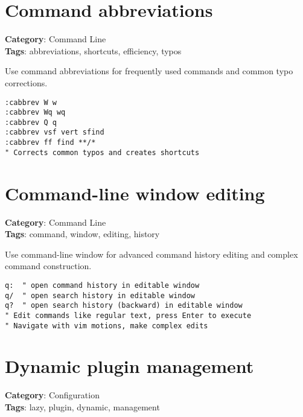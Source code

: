 {{{\section{Command abbreviations}

\textbf{Category}: Command Line\\ \textbf{Tags}: abbreviations, shortcuts, efficiency, typos
\vspace{0.5cm}

Use command abbreviations for frequently used commands and common typo corrections.

\begin{Exa*}{}
\begin{Verbatim}[fontsize=\footnotesize, breaklines, breakanywhere]
:cabbrev W w
:cabbrev Wq wq
:cabbrev Q q
:cabbrev vsf vert sfind
:cabbrev ff find **/*
" Corrects common typos and creates shortcuts
\end{Verbatim}
\end{Exa*}

\section{Command-line window editing}

\textbf{Category}: Command Line\\ \textbf{Tags}: command, window, editing, history
\vspace{0.5cm}

Use command-line window for advanced command history editing and complex command construction.

\begin{Exa*}{}
\begin{Verbatim}[fontsize=\footnotesize, breaklines, breakanywhere]
q:  " open command history in editable window
q/  " open search history in editable window  
q?  " open search history (backward) in editable window
" Edit commands like regular text, press Enter to execute
" Navigate with vim motions, make complex edits
\end{Verbatim}
\end{Exa*}

\section{Dynamic plugin management}

\textbf{Category}: Configuration\\ \textbf{Tags}: lazy, plugin, dynamic, management
\vspace{0.5cm}

}}}
